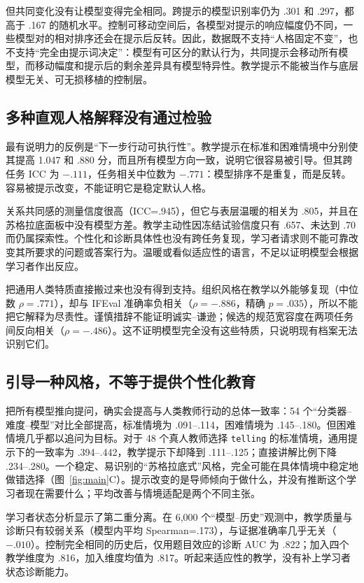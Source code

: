 \documentclass[11pt,a4paper,UTF8]{ctexart}
\begin{document}
但共同变化没有让模型变得完全相同。跨提示的模型识别率仍为 .301 和 .297，都高于 .167 的随机水平。控制可移动空间后，各模型对提示的响应幅度仍不同，一些模型对的相对排序还会在提示后反转。因此，数据既不支持“人格固定不变”，也不支持“完全由提示词决定”：模型有可区分的默认行为，共同提示会移动所有模型，而移动幅度和提示后的剩余差异具有模型特异性。教学提示不能被当作与底层模型无关、可无损移植的控制层。

\subsection{多种直观人格解释没有通过检验}

最有说明力的反例是“下一步行动可执行性”。教学提示在标准和困难情境中分别使其提高 1.047 和 .880 分，而且所有模型方向一致，说明它很容易被引导。但其跨任务 ICC 为 $-.111$，任务相关中位数为 $-.771$：模型排序不是重复，而是反转。容易被提示改变，不能证明它是稳定默认人格。

关系共同感的测量信度很高（ICC=.945），但它与表层温暖的相关为 .805，并且在苏格拉底面板中没有模型方差。教学主动性因冻结试验信度只有 .657、未达到 .70 而仍属探索性。个性化和诊断具体性也没有跨任务复现，学习者请求则不能可靠改变其所要求的问题或答案行为。温暖或看似适应性的语言，不足以证明模型会根据学习者作出反应。

把通用人类特质直接搬过来也没有得到支持。组织风格在教学以外能够复现（中位数 $\rho=.771$），却与 IFEval 准确率负相关（$\rho=-.886$，精确 $p=.035$），所以不能把它解释为尽责性。谨慎措辞不能证明诚实--谦逊；候选的规范宽容度在两项任务间反向相关（$\rho=-.486$）。这不证明模型完全没有这些特质，只说明现有档案无法识别它们。

\subsection{引导一种风格，不等于提供个性化教育}

把所有模型推向提问，确实会提高与人类教师行动的总体一致率：54 个“分类器--难度--模型”对比全部提高，标准情境为 .091--.114，困难情境为 .145--.180。但困难情境几乎都以追问为目标。对于 48 个真人教师选择 \texttt{telling} 的标准情境，通用提示下的一致率为 .394--.442，教学提示下却降到 .111--.125；直接讲解比例下降 .234--.280。一个稳定、易识别的“苏格拉底式”风格，完全可能在具体情境中稳定地做错选择（图~\ref{fig:main}C）。提示改变的是导师倾向于做什么，并没有推断这个学习者现在需要什么；平均改善与情境适配是两个不同主张。

学习者状态分析显示了第二重分离。在 6,000 个“模型--历史”观测中，教学质量与诊断只有较弱关系（模型内平均 Spearman=.173），与证据准确率几乎无关（$-.010$）。控制完全相同的历史后，仅用题目效应的诊断 AUC 为 .822；加入四个教学维度为 .816，加入维度均值为 .817。听起来适应性的教学，没有补上学习者状态诊断能力。
\end{document}
